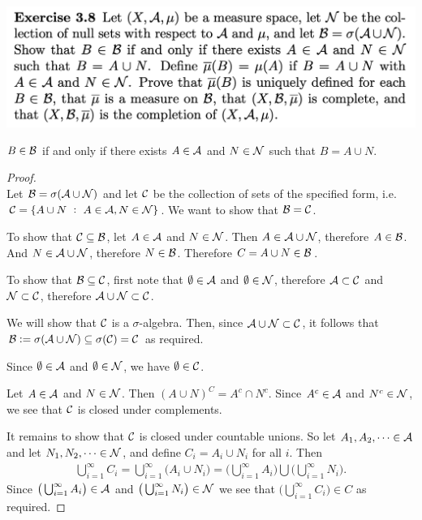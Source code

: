 \newpage
\begin{mdframed}
\includegraphics[width=400pt]{img/analysis--berkeley-202a-hw04-c88b.png}
\end{mdframed}

\begin{claim*}\label{claim-3-8-1}
  $B \in \mathcal B$ if and only if there exists $A \in \mathcal A$ and $N \in \mathcal N$ such that $B = A \cup N$.
\end{claim*}

\begin{proof}~\\
  Let $\mathcal B = \sigma(\mathcal A \cup \mathcal N)$ and let $\mathcal C$ be the collection of sets of the specified form,
  i.e. $\mathcal C = \{A \cup N ~:~ A \in \mathcal A, N \in \mathcal N\}$. We want to show that $\mathcal B = \mathcal C$.

  To show that $\mathcal C \subseteq \mathcal B$, let $A \in \mathcal A$ and $N \in \mathcal N$. Then $A \in \mathcal A \cup \mathcal N$,
  therefore $A \in \mathcal B$. And $N \in \mathcal A \cup \mathcal N$, therefore $N \in \mathcal B$.
  Therefore $C = A \cup N \in \mathcal B$.

  To show that $\mathcal B \subseteq \mathcal C$, first note that $\emptyset \in \mathcal A$ and $\emptyset \in \mathcal N$,
  therefore $\mathcal A \subset \mathcal C$ and $\mathcal N \subset \mathcal C$, therefore $\mathcal A \cup \mathcal N \subset \mathcal C$.

  We will show that $\mathcal C$ is a $\sigma$-algebra. Then, since $\mathcal A \cup \mathcal N \subset \mathcal C$, it follows
  that $\mathcal B := \sigma(\mathcal A \cup \mathcal N) \subseteq \sigma(\mathcal C) = \mathcal C$ as required.

  Since $\emptyset \in \mathcal A$ and $\emptyset \in \mathcal N$, we have $\emptyset \in \mathcal C$.

  Let $A \in \mathcal A$ and $N \in \mathcal N$. Then $(A \cup N)^C = A^c \cap N^c$. Since $A^c \in \mathcal A$
  and $N^c \in \mathcal N$, we see that $\mathcal C$ is closed under complements.

  It remains to show that $\mathcal C$ is closed under countable unions. So let $A_1, A_2, \dots \in \mathcal A$ and
  let $N_1, N_2, \dots \in \mathcal N$, and define $C_i = A_i \cup N_i$ for all $i$. Then
  \begin{align*}
    \bigcup_{i=1}^\infty C_i = \bigcup_{i=1}^\infty \big(A_i \cup N_i\big) = \big(\bigcup_{i=1}^\infty A_i\big) \bigcup \big(\bigcup_{i=1}^\infty N_i \big).
  \end{align*}
  Since $\big(\bigcup_{i=1}^\infty A_i\big) \in \mathcal A$ and $\big(\bigcup_{i=1}^\infty N_i\big) \in \mathcal N$ we see that $\big(\bigcup_{i=1}^\infty C_i\big) \in C$ as required.
\end{proof}

